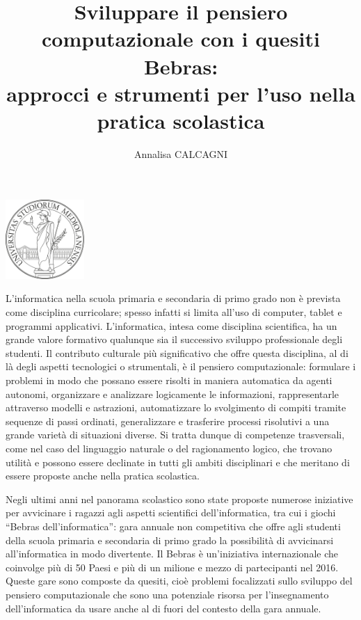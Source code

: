 \documentclass[12pt]{report}
\begin{document}
\begin{center}
	\includegraphics[height=3.0cm]{logo_unimi.png}
\end{center}


\title {\textbf{Sviluppare il pensiero \\[1mm]computazionale con i quesiti Bebras: \\[1mm]approcci e strumenti per l'uso nella \\[1mm]pratica scolastica\\[1mm]}} 
\author{Annalisa CALCAGNI}
%
%

\beforepreface


% 
\afterpreface
\doublespacing
%

L'informatica nella scuola primaria e secondaria di primo grado non è prevista come disciplina curricolare; spesso infatti si limita all'uso di computer, tablet e programmi applicativi. L'informatica, intesa come disciplina scientifica, ha un grande valore formativo qualunque sia il successivo sviluppo professionale degli studenti. Il contributo culturale più significativo che offre questa disciplina, al di là degli aspetti tecnologici o strumentali, è il pensiero computazionale: formulare i problemi in modo che possano essere risolti in maniera automatica da agenti autonomi, organizzare e analizzare logicamente le informazioni, rappresentarle attraverso modelli e astrazioni, automatizzare lo svolgimento di compiti tramite sequenze di passi ordinati, generalizzare e trasferire processi risolutivi a una grande varietà di situazioni diverse. 
Si tratta dunque di competenze trasversali, come nel caso del linguaggio naturale o del ragionamento logico, che trovano utilità e possono essere declinate in tutti gli ambiti disciplinari e che meritano di essere proposte anche nella pratica scolastica.


Negli ultimi anni nel panorama scolastico sono state proposte numerose iniziative per avvicinare i ragazzi agli aspetti scientifici dell'informatica, tra cui i giochi ``Bebras dell'informatica'': gara annuale non competitiva che offre agli studenti della scuola primaria e secondaria di primo grado la possibilità di avvicinarsi all'informatica in modo divertente.
Il Bebras è un'iniziativa internazionale che coinvolge più di 50 Paesi e più di un milione e mezzo di partecipanti nel 2016.
Queste gare sono composte da quesiti, cioè problemi focalizzati sullo sviluppo del pensiero computazionale che sono una potenziale risorsa per l'insegnamento dell'informatica da usare anche al di fuori del contesto della gara annuale.
\end{document}
